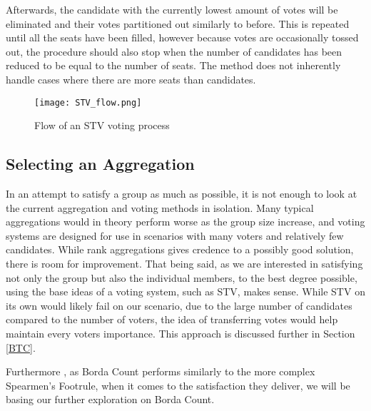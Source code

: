 Afterwards, the candidate with the currently lowest amount of votes will be eliminated and their votes partitioned out similarly to before. This is repeated until all the seats have been filled, however because votes are occasionally tossed out, the procedure should also stop when the number of candidates has been reduced to be equal to the number of seats. The method does not inherently handle cases where there are more seats than candidates.

\begin{figure}
	\centering
	\texttt{[image: STV\_flow.png]}
	\caption{Flow of an STV voting process}
	\label{fig:stvflow}
\end{figure}


\subsection{Selecting an Aggregation}
In an attempt to satisfy a group as much as possible, it is not enough to look at the current aggregation and voting methods in isolation. Many typical aggregations would in theory perform worse as the group size increase, and voting systems are designed for use in scenarios with many voters and relatively few candidates. While rank aggregations gives credence to a possibly good solution, there is room for improvement. That being said, as we are interested in satisfying not only the group but also the individual members, to the best degree possible, using the base ideas of a voting system, such as STV, makes sense. While STV on its own would likely fail on our scenario, due to the large number of candidates compared to the number of voters, the idea of transferring votes would help maintain every voters importance. This approach is discussed further in Section \ref{BTC}.

Furthermore , as Borda Count performs similarly to the more complex Spearmen's Footrule, when it comes to the satisfaction they deliver, we will be basing our further exploration on Borda Count\cite{baltrunas}.
